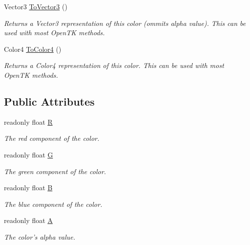\begin{DoxyCompactItemize}
Vector3 \hyperlink{struct_tri_devs_1_1_tri_engine_1_1_color_aad4ad5d8764847e0bf3fb4ccb17a94b8}{To\-Vector3} ()
\begin{DoxyCompactList}\small\item\em Returns a Vector3 representation of this color (ommits alpha value). This can be used with most Open\-T\-K methods. \end{DoxyCompactList}\item 
Color4 \hyperlink{struct_tri_devs_1_1_tri_engine_1_1_color_add2dc2c8542f1209ae7b9db4ead2cff1}{To\-Color4} ()
\begin{DoxyCompactList}\small\item\em Returns a Color4 representation of this color. This can be used with most Open\-T\-K methods. \end{DoxyCompactList}\end{DoxyCompactItemize}
\subsection*{Public Attributes}
\begin{DoxyCompactItemize}
\item 
readonly float \hyperlink{struct_tri_devs_1_1_tri_engine_1_1_color_ab31693fb99effc5b2b761a6f53f247ca}{R}
\begin{DoxyCompactList}\small\item\em The red component of the color. \end{DoxyCompactList}\item 
readonly float \hyperlink{struct_tri_devs_1_1_tri_engine_1_1_color_ac07b8afa44f3087b0f4db3a46198f9eb}{G}
\begin{DoxyCompactList}\small\item\em The green component of the color. \end{DoxyCompactList}\item 
readonly float \hyperlink{struct_tri_devs_1_1_tri_engine_1_1_color_a83c0cf98d6809a4c38e8759f268dc894}{B}
\begin{DoxyCompactList}\small\item\em The blue component of the color. \end{DoxyCompactList}\item 
readonly float \hyperlink{struct_tri_devs_1_1_tri_engine_1_1_color_a2f3c69e048a12a4e78985e5b7973c030}{A}
\begin{DoxyCompactList}\small\item\em The color's alpha value. \end{DoxyCompactList}\end{DoxyCompactItemize}
